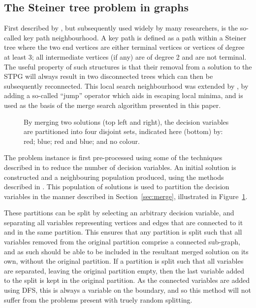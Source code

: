 \documentclass[preprint]{elsarticle}
\begin{document}
\subsection{The Steiner tree problem in graphs}


First described by \citet{kp:dowsland}, but subsequently used widely by many researchers, is the so-called key path neighbourhood. A key path is defined as a path within a Steiner tree where the two end vertices are either terminal vertices or vertices of degree at least 3; all intermediate  vertices (if any) are of degree 2 and are not terminal. The useful property of such structures is that their removal from a solution to the STPG will always result in two disconnected trees which can then be subsequently reconnected. This local search neighbourhood was extended by \citet{gecco16}, by adding a so-called ``jump'' operator which aids in escaping local minima, and is used as the basis of the merge search algorithm presented in this paper.

\begin{figure}[h]
\centering
{}
    \caption[Partitioning variables by merging solutions]{By merging two solutions (top left and right), the decision variables are partitioned into four disjoint sets, indicated here (bottom) by: red; blue; red and blue; and no colour.}\label{fig:stpg-partition} 
\end{figure}

The problem instance is first pre-processed using some of the techniques described in \citet{pp:duin,pp:uchoa,stpg-reduce} to reduce the number of decision variables. An initial solution is constructed and a neighbouring population produced, using the methods described in \citet{gecco16}. This population of solutions is used to partition the decision variables in the manner described in Section~\ref{sec:merge}, illustrated in Figure~\ref{fig:stpg-partition}.


These partitions can be split by selecting an arbitrary decision variable, and separating all variables representing vertices and edges that are connected to it and in the same partition. This ensures that any partition is split such that all variables removed from the original partition comprise a connected sub-graph, and as such should be able to be included in the resultant merged solution on its own, without the original partition. If a partition is split such that all variables are separated, leaving the original partition empty, then the last variable added to the split is kept in the original partition. As the connected variables are added using DFS, this is always a variable on the boundary, and so this method will not suffer from the problems present with truely random splitting. 
\end{document}
